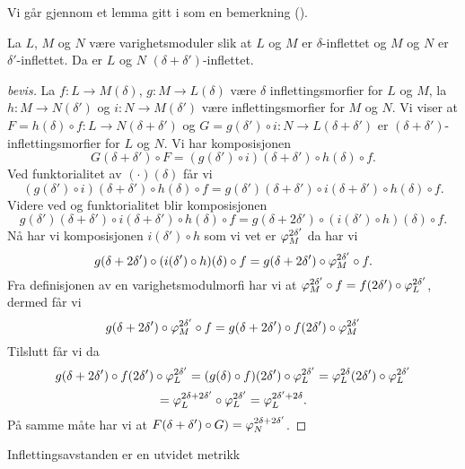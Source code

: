 Vi går gjennom et lemma gitt i \cite{Bauer2015} som en bemerkning (\cite[Remark 3.1]{Bauer2015}).

\begin{lemma}\label{lem:Inf_Sum}
La $L$, $M$ og $N$ være varighetsmoduler slik at $L$ og $M$ er $\delta$-inflettet og $M$ og $N$ er $\delta'$-inflettet. Da er $L$ og $N$ $(\delta+\delta')$-inflettet.
\end{lemma}
\begin{proof}[bevis]
La $f: L\to M(\delta)$, $g: M\to L(\delta)$ være $\delta$ inflettingsmorfier for $L$ og $M$, la $h: M\to N(\delta')$ og $i: N\to M(\delta')$ være inflettingsmorfier for $M$ og $N$. Vi viser at $F = h(\delta)\circ f:L\to N(\delta+\delta')$ og $G=g(\delta')\circ i: N\to L(\delta+\delta')$ er $(\delta+\delta')$-inflettingsmorfier for $L$ og $N$. Vi har komposisjonen
\[G(\delta+\delta')\circ F = (g(\delta')\circ i)(\delta+\delta')\circ h(\delta)\circ f.\]
Ved funktorialitet av $(\cdot)(\delta)$ får vi
\[(g(\delta')\circ i)(\delta+\delta')\circ h(\delta)\circ f = g(\delta')(\delta+\delta')\circ i(\delta+\delta')\circ h(\delta)\circ f.\]
Videre ved  og funktorialitet blir komposisjonen
\[g(\delta')(\delta+\delta')\circ i(\delta+\delta')\circ h(\delta)\circ f= g(\delta+2\delta')\circ (i(\delta')\circ h)(\delta)\circ f.\]
Nå har vi komposisjonen $i(\delta')\circ h$ som vi vet er $\varphi^{2\delta'}_M$ da har vi
\[g(\delta+2\delta')\circ (i(\delta')\circ h)(\delta)\circ f=g(\delta+2\delta')\circ\varphi_M^{2\delta'}\circ f.\]
Fra definisjonen av en varighetsmodulmorfi har vi at $\varphi_M^{2\delta'}\circ f=f(2\delta')\circ\varphi_L^{2\delta'}$, dermed får vi
\[g(\delta+2\delta')\circ\varphi_M^{2\delta'}\circ f=g(\delta+2\delta')\circ f(2\delta')\circ \varphi_M^{2\delta'}\]
Tilslutt får vi da
\[g(\delta+2\delta')\circ f(2\delta')\circ \varphi_L^{2\delta'}=(g(\delta)\circ f)(2\delta')\circ\varphi_L^{2\delta'} = \varphi_L^{2\delta}(2\delta')\circ \varphi_L^{2\delta'}\]
\[=\varphi_L^{2\delta+2\delta'}\circ \varphi_L^{2\delta'}=\varphi_L^{2\delta'+2\delta}.\]
På samme måte har vi at $F(\delta+\delta')\circ G)=\varphi_N^{2\delta+2\delta'}$.
\end{proof}

\begin{teorem}\label{trm:Utvidet-Metrikk}
  Inflettingsavstanden er en utvidet metrikk
\end{teorem}

